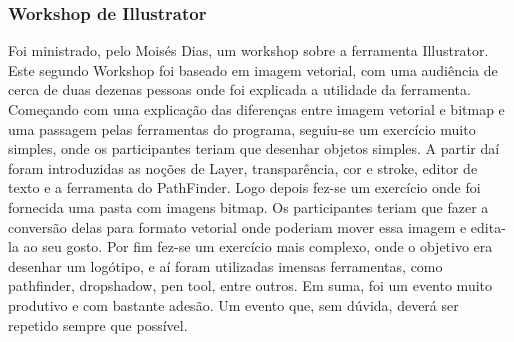 
\subsubsection{Workshop de Illustrator}

Foi ministrado, pelo Moisés Dias, um workshop sobre a ferramenta Illustrator. Este segundo Workshop foi baseado em imagem vetorial, com uma audiência de cerca de duas dezenas pessoas onde foi explicada a utilidade da ferramenta. Começando com uma explicação das diferenças entre imagem vetorial e bitmap e uma passagem pelas ferramentas do programa, seguiu-se um exercício muito simples, onde os participantes teriam que desenhar objetos simples. A partir daí foram introduzidas as noções de Layer, transparência, cor e stroke, editor de texto e a ferramenta do PathFinder. Logo depois fez-se um exercício onde foi fornecida uma pasta com imagens bitmap. Os participantes teriam que fazer a conversão delas para formato vetorial onde poderiam mover essa imagem e edita-la ao seu gosto. Por fim fez-se um exercício mais complexo, onde o objetivo era desenhar um logótipo, e aí foram utilizadas imensas ferramentas, como pathfinder, dropshadow, pen tool, entre outros. Em suma, foi um evento muito produtivo e com bastante adesão. Um evento que, sem dúvida, deverá ser repetido sempre que possível.